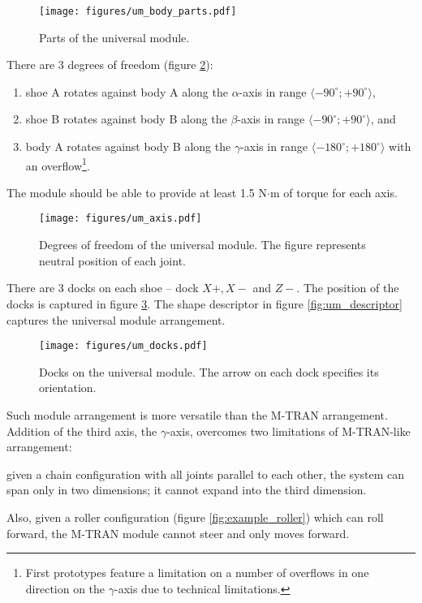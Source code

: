 \begin{figure}[t]
    \centering
    \texttt{[image: figures/um\_body\_parts.pdf]}
    \caption{Parts of the universal module.}
    \label{fig:um_body_parts}
\end{figure}

There are 3 degrees of freedom (figure \ref{fig:um_axis}):
\begin{enumerate}
    \item shoe A rotates against body A along the $\alpha$-axis in range
    $\langle -90^\circ; +90^\circ\rangle$,
    \item shoe B rotates against body B along the $\beta$-axis in range
    $\langle -90^\circ; +90^\circ\rangle$, and
    \item body A rotates against body B along the $\gamma$-axis in range
    $\langle -180^\circ; +180^\circ\rangle$ with an overflow\footnote{First
    prototypes feature a limitation on a number of overflows in one direction on
    the $\gamma$-axis due to technical limitations. }.
\end{enumerate}
The module should be able to provide at least 1.5 N$\cdot$m of
torque for each axis.

\begin{figure}[!t]
    \centering
    \texttt{[image: figures/um\_axis.pdf]}
    \caption{Degrees of freedom of the universal module. The figure represents
    neutral position of each joint.}
    \label{fig:um_axis}
\end{figure}

There are 3 docks on each shoe -- dock $X+, X-$ and $Z-$. The position of the
docks is captured in figure \ref{fig:um_docks}. The shape descriptor in figure
\ref{fig:um_descriptor} captures the universal module arrangement.

\begin{figure}[!t]
    \centering
    \texttt{[image: figures/um\_docks.pdf]}
    \caption{Docks on the universal module. The arrow on each dock specifies its orientation.}
    \label{fig:um_docks}
\end{figure}

Such module arrangement is more versatile than the M-TRAN arrangement. Addition
of the third axis, the $\gamma$-axis, overcomes two limitations of M-TRAN-like
arrangement:
\begin{enumerate*}
    \item given a chain configuration with all joints parallel to each other,
    the system can span only in two dimensions; it cannot expand into the third
    dimension.
    \item Also, given a roller configuration (figure \ref{fig:example_roller})
    which can roll forward, the M-TRAN module cannot steer and only moves
    forward.
\end{enumerate*}

